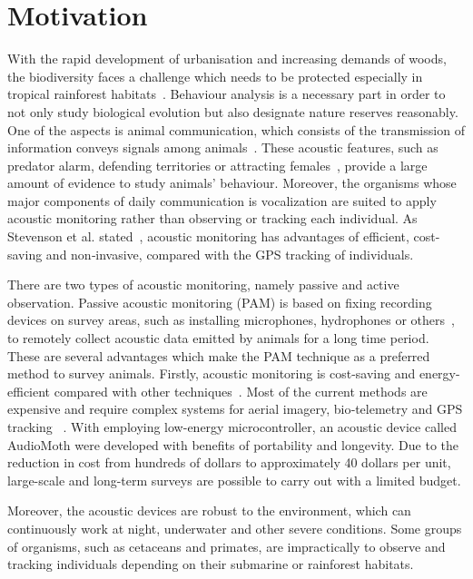 \section{Motivation}
With the rapid development of urbanisation and increasing demands of woods, the biodiversity faces a challenge which needs to be protected especially in tropical rainforest habitats~\cite{soga2014land,wright2006uncertain}. Behaviour analysis is a necessary part in order to not only study biological evolution but also designate nature reserves reasonably. One of the aspects is animal communication, which consists of the transmission of information conveys signals among animals~\cite{green1979analysis}. These acoustic features, such as predator alarm, defending territories or attracting females~\cite{seyfarth2003signalers}, provide a large amount of evidence to study animals' behaviour. Moreover, the organisms whose major components of daily communication is vocalization are suited to apply acoustic monitoring rather than observing or tracking each individual. As Stevenson et al. stated~\cite{stevenson2015general}, acoustic monitoring has advantages of efficient, cost-saving and non‐invasive, compared with the GPS tracking of individuals. \par
There are two types of acoustic monitoring, namely passive and active observation. Passive acoustic monitoring (PAM) is based on fixing recording devices on survey areas, such as installing microphones, hydrophones or others~\cite{kalan2015towards}, to remotely collect acoustic data emitted by animals for a long time period. These are several advantages which make the PAM technique as a preferred method to survey animals. Firstly, acoustic monitoring is cost-saving and energy-efficient compared with other techniques~\cite{mellinger2007overview}. 
Most of the current methods are expensive and require complex systems for aerial imagery, bio‐telemetry and GPS tracking ~\cite{hill2018audiomoth}. With employing low-energy microcontroller, an acoustic device called AudioMoth were developed with benefits of portability and longevity. Due to the reduction in cost from hundreds of dollars to approximately 40 dollars per unit, large-scale and long-term surveys are possible to carry out with a limited budget. \par
Moreover, the acoustic devices are robust to the environment, which can continuously work at night, underwater and other severe conditions. Some groups of organisms, such as cetaceans and primates, are impractically to observe and tracking individuals depending on their submarine or rainforest habitats.
